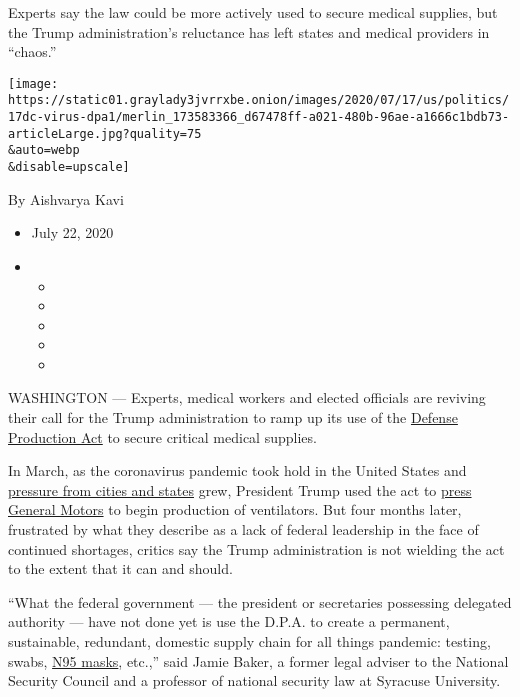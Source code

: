 Experts say the law could be more actively used to secure medical
supplies, but the Trump administration's reluctance has left states and
medical providers in ``chaos.''

\texttt{[image: https://static01.graylady3jvrrxbe.onion/images/2020/07/17/us/politics/17dc-virus-dpa1/merlin\_173583366\_d67478ff-a021-480b-96ae-a1666c1bdb73-articleLarge.jpg?quality=75\\\&auto=webp\\\&disable=upscale]}

By Aishvarya Kavi

\begin{itemize}
\item
  July 22, 2020
\item
  \begin{itemize}
  \item
  \item
  \item
  \item
  \item
  \end{itemize}
\end{itemize}

WASHINGTON --- Experts, medical workers and elected officials are
reviving their call for the Trump administration to ramp up its use of
the
\href{https://www.nytimes3xbfgragh.onion/2020/03/20/us/politics/defense-production-act-virus.html}{Defense
Production Act} to secure critical medical supplies.

In March, as the coronavirus pandemic took hold in the United States and
\href{https://www.nytimes3xbfgragh.onion/2020/03/27/us/politics/coronavirus-trump-ventilators-gm-ventec.html}{pressure
from cities and states} grew, President Trump used the act to
\href{https://www.nytimes3xbfgragh.onion/2020/03/30/business/gm-ventilators-coronavirus-trump.html}{press
General Motors} to begin production of ventilators. But four months
later, frustrated by what they describe as a lack of federal leadership
in the face of continued shortages, critics say the Trump administration
is not wielding the act to the extent that it can and should.

``What the federal government --- the president or secretaries
possessing delegated authority --- have not done yet is use the D.P.A.
to create a permanent, sustainable, redundant, domestic supply chain for
all things pandemic: testing, swabs,
\href{https://www.nytimes3xbfgragh.onion/2020/06/01/health/masks-surgical-N95-coronavirus.html}{N95
masks}, etc.,'' said Jamie Baker, a former legal adviser to the National
Security Council and a professor of national security law at Syracuse
University.

